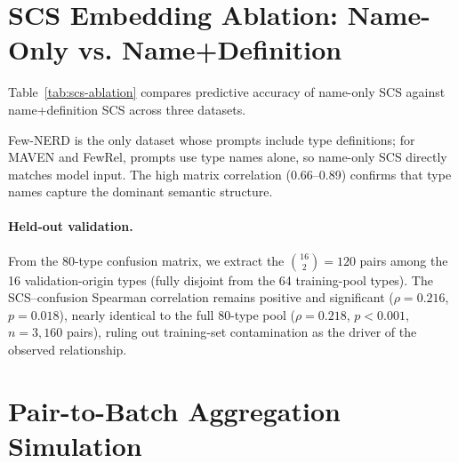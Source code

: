 \documentclass[11pt]{article}
\begin{document}
\section{SCS Embedding Ablation: Name-Only vs. Name+Definition}
\label{app:scs-ablation}

Table~\ref{tab:scs-ablation} compares predictive accuracy of name-only SCS against name+definition SCS across three datasets.

\begin{table}[h]
\centering
\small
\caption{Pearson correlation between SCS and empirical confusion rate. ``Def'' concatenates type name with definition before embedding. All correlations significant ($p < 0.001$). The inconsistent direction of $\Delta r$ indicates that definitions provide no systematic benefit.}
\label{tab:scs-ablation}
\end{table}

Few-NERD is the only dataset whose prompts include type definitions; for MAVEN and FewRel, prompts use type names alone, so name-only SCS directly matches model input. The high matrix correlation (0.66--0.89) confirms that type names capture the dominant semantic structure.

\paragraph{Held-out validation.}
\label{app:scs-heldout-validation}
From the 80-type confusion matrix, we extract the $\binom{16}{2} = 120$ pairs among the 16 validation-origin types (fully disjoint from the 64 training-pool types). The SCS--confusion Spearman correlation remains positive and significant ($\rho = 0.216$, $p = 0.018$), nearly identical to the full 80-type pool ($\rho = 0.218$, $p < 0.001$, $n = 3{,}160$ pairs), ruling out training-set contamination as the driver of the observed relationship.

\section{Pair-to-Batch Aggregation Simulation}
\label{app:aggregation-sim}
\end{document}
